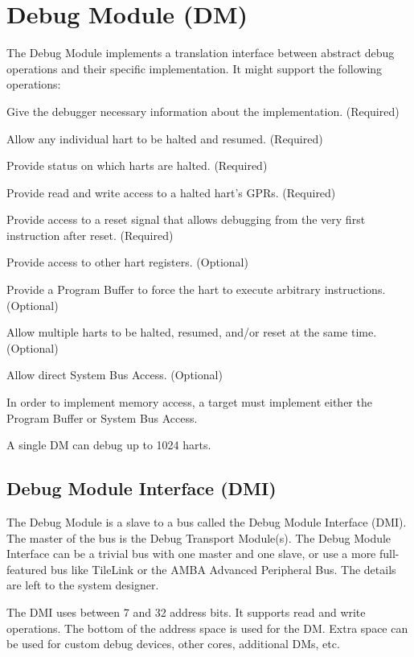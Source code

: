 
\chapter{Debug Module (DM)} \label{dm}

\begin{steps}{The Debug Module implements a translation interface between abstract debug
    operations and their specific implementation. It might support the following
    operations:}
\item Give the debugger necessary information about the implementation. (Required)
\item Allow any individual hart to be halted and resumed. (Required)
\item Provide status on which harts are halted. (Required)
\item Provide read and write access to a halted hart's GPRs. (Required)
\item Provide access to a reset signal that allows debugging from the very
    first instruction after reset. (Required)
\item Provide access to other hart registers. (Optional)
\item Provide a Program Buffer to force the hart to execute arbitrary instructions. (Optional)
\item Allow multiple harts to be halted, resumed, and/or reset at the same time. (Optional)
\item Allow direct System Bus Access. (Optional)
\end{steps}

In order to implement memory access, a target must implement either the Program
Buffer or System Bus Access.

A single DM can debug up to 1024 harts.

\section{Debug Module Interface (DMI)} \label{dmi}

The Debug Module is a slave to a bus called the Debug Module Interface (DMI). The
master of the bus is the Debug Transport Module(s).
The Debug Module Interface can be a trivial bus with one master and one slave,
or use a more full-featured bus like TileLink or the AMBA Advanced Peripheral
Bus. The details are left to the system designer.

The DMI uses between 7 and 32 address bits.  It supports read and write
operations.  The bottom of the address space is
used for the DM. Extra space can be used for custom debug devices, other cores,
additional DMs, etc.


